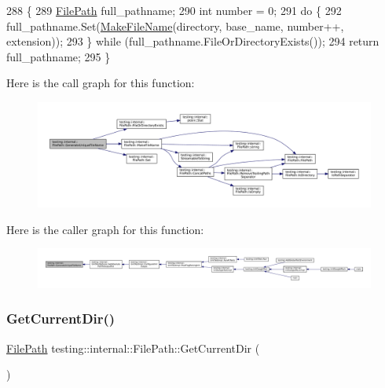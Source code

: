 \begin{DoxyCode}
288                                                                  \{
289   \hyperlink{classtesting_1_1internal_1_1FilePath_a3504a51accbca78a52fe586133ea5499}{FilePath} full\_pathname;
290   \textcolor{keywordtype}{int} number = 0;
291   \textcolor{keywordflow}{do} \{
292     full\_pathname.Set(\hyperlink{classtesting_1_1internal_1_1FilePath_aa8c102da670261eb4fa8e2f2481df139}{MakeFileName}(directory, base\_name, number++, extension));
293   \} \textcolor{keywordflow}{while} (full\_pathname.FileOrDirectoryExists());
294   \textcolor{keywordflow}{return} full\_pathname;
295 \}
\end{DoxyCode}
Here is the call graph for this function\+:
\nopagebreak
\begin{figure}[H]
\begin{center}
\leavevmode
\includegraphics[width=350pt]{classtesting_1_1internal_1_1FilePath_a2280a77adb394cf80bb5f73fc292e8c8_cgraph}
\end{center}
\end{figure}
Here is the caller graph for this function\+:
\nopagebreak
\begin{figure}[H]
\begin{center}
\leavevmode
\includegraphics[width=350pt]{classtesting_1_1internal_1_1FilePath_a2280a77adb394cf80bb5f73fc292e8c8_icgraph}
\end{center}
\end{figure}
\mbox{\label{classtesting_1_1internal_1_1FilePath_aaff39ccd7bfb7a1c09c0220a64326387}} 
\subsubsection{\texorpdfstring{Get\+Current\+Dir()}{GetCurrentDir()}}
{\footnotesize\ttfamily \hyperlink{classtesting_1_1internal_1_1FilePath}{File\+Path} testing\+::internal\+::\+File\+Path\+::\+Get\+Current\+Dir (\begin{DoxyParamCaption}{ }\end{DoxyParamCaption})\hspace{0.3cm}{\ttfamily [static]}}



